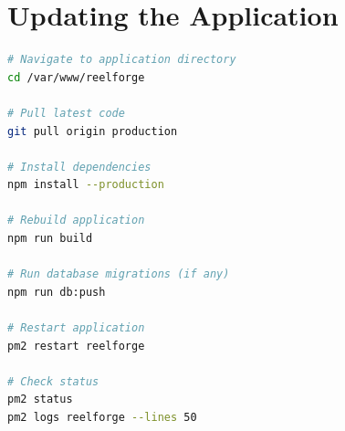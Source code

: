 \section{Updating the Application}

\begin{lstlisting}[language=bash]
# Navigate to application directory
cd /var/www/reelforge

# Pull latest code
git pull origin production

# Install dependencies
npm install --production

# Rebuild application
npm run build

# Run database migrations (if any)
npm run db:push

# Restart application
pm2 restart reelforge

# Check status
pm2 status
pm2 logs reelforge --lines 50
\end{lstlisting}
